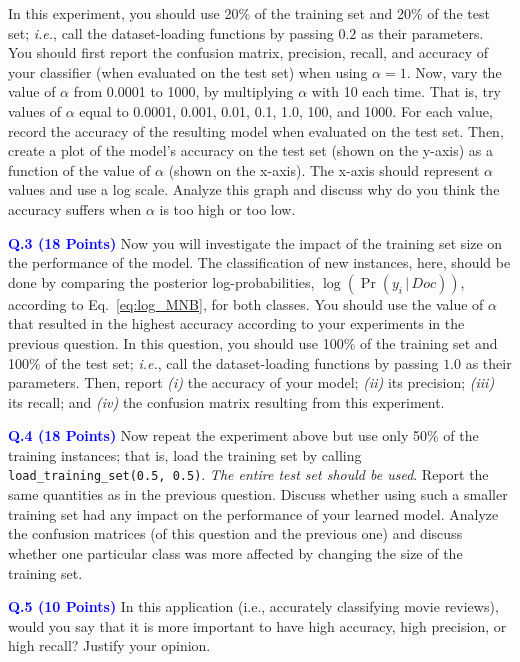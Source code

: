\documentclass[letterpaper]{article}
\newcommand{\HIGHLIGHT}[1]{\textcolor{blue}{\textbf{#1}}}
\begin{document}
In this experiment, you should use 20\% of the training set and 20\% of the test set; \textit{i.e.}, call the dataset-loading functions by passing $0.2$ as their parameters. You should first report the confusion matrix, precision, recall, and accuracy of your classifier (when evaluated on the test set) when using $\alpha = 1$. Now, vary the value of $\alpha$ from 0.0001 to 1000, by multiplying $\alpha$ with 10 each time. That is, try values of $\alpha$ equal to 0.0001, 0.001, 0.01, 0.1, 1.0, 100, and 1000. For each value, record the accuracy of the resulting model when evaluated on the test set. Then, create a plot of the model's accuracy on the test set (shown on the y-axis) as a function of the value of $\alpha$ (shown on the x-axis). The x-axis should represent $\alpha$ values and use a log scale. Analyze this graph and discuss why do you think the accuracy suffers when $\alpha$ is too high or too low.
%
%


\noindent \HIGHLIGHT{Q.3 (18 Points)} Now you will investigate the impact of the training set size on the performance of the model. The classification of new instances, here, should be done by comparing the posterior log-probabilities, $\log(\Pr(y_i \, | \, Doc))$, according to Eq.~\eqref{eq:log_MNB}, for both classes. You should use the value of $\alpha$ that resulted in the highest accuracy according to your experiments in the previous question. In this question, you should use 100\% of the training set and 100\% of the test set; \textit{i.e.}, call the dataset-loading functions by passing $1.0$ as their parameters. Then, report \textit{(i)} the accuracy of your model; \textit{(ii)} its precision; \textit{(iii)} its recall; and \textit{(iv)} the confusion matrix resulting from this experiment.
%
%



\noindent \HIGHLIGHT{Q.4 (18 Points)} Now repeat the experiment above but use only 50\% of the training instances; that is, load the training set by calling \texttt{load\_training\_set(0.5, 0.5)}. \textit{The entire test set should be used}. Report the same quantities as in the previous question. Discuss whether using such a smaller training set had any impact on the performance of your learned model. Analyze the confusion matrices (of this question and the previous one) and discuss whether one particular class was more affected by changing the size of the training set. 
%
%



\noindent \HIGHLIGHT{Q.5 (10 Points)} In this application (i.e., accurately classifying movie reviews), would you say that it is more important to have high accuracy, high precision, or high recall? Justify your opinion.
%
%
\end{document}
